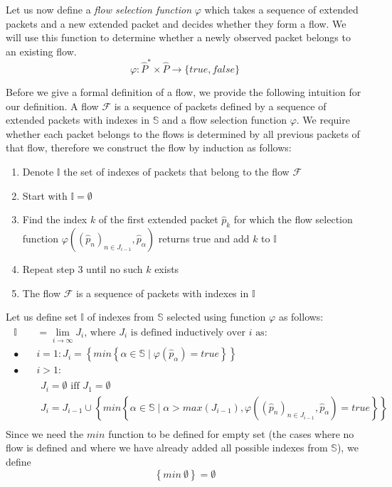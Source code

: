 Let us now define a \emph{flow selection function} $\varphi$ which takes a sequence of extended packets and a new extended packet and decides whether they form a flow. We will use this function to determine whether a newly observed packet belongs to an existing flow.
\begin{equation}
 	\varphi: \widehat{P}^*\times \widehat{P} \to \{true,false\}
\end{equation}

Before we give a formal definition of a flow, we provide the following intuition for our definition. A flow $\mathcal{F}$ is a sequence of packets defined by a sequence of extended packets with indexes in $\mathbb{S}$ and a flow selection function $\varphi$. We require whether each packet belongs to the flows is determined by all previous packets of that flow, therefore we construct the flow by induction as follows:
\begin{enumerate}[noitemsep]
	\item Denote $\mathbb{I}$ the set of indexes of packets that belong to the flow $\mathcal{F}$
	\item Start with $\mathbb{I} = \emptyset$
	\item Find the index $k$ of the first extended packet $\widehat{p}_k$ for which the flow selection function $\varphi((\widehat{p}_n)_{n\in J_{i-1}}, \widehat{p}_{\alpha})$ returns true and add $k$ to $\mathbb{I}$
	\item Repeat step 3 until no such $k$ exists
	\item The flow $\mathcal{F}$ is a sequence of packets with indexes in $\mathbb{I}$
\end{enumerate}

Let us define set $\mathbb{I}$ of indexes from $\mathbb{S}$ selected using function $\varphi$ as follows:
\begin{align}\label{eq:flow-indexes}
\begin{split}
\mathbb{I} &= \lim_{i \to \infty} J_i \mbox{, where } J_i \mbox{ is defined inductively over }i \mbox{ as:} \\
\bullet\quad &i = 1: 
	J_i = \left\{min\left\{ \alpha \in \mathbb{S} \mid \varphi(\widehat{p}_{\alpha}) = true \right\}\right\} \\
\bullet\quad &i > 1: \\
	&\begin{array}{l}
		J_i = \emptyset \mbox{ iff } J_1 = \emptyset \\
		J_i = J_{i-1} \cup \left\{min\left\{ \alpha \in \mathbb{S} \mid \alpha > max(J_{i-1}), \varphi((\widehat{p}_n)_{n\in J_{i-1}}, \widehat{p}_{\alpha}) = true \right\}\right\}
	\end{array}
\end{split}
\end{align}
Since we need the $min$ function to be defined for empty set (the cases where no flow is defined and where we have already added all possible indexes from $\mathbb{S}$), we define
\begin{equation*}
	\left\{min\ \emptyset \right\} = \emptyset
\end{equation*}

